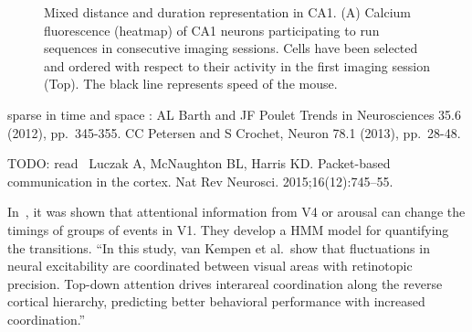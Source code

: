 \documentclass[brainsci, %
               review,submit,pdftex,moreauthors%
               ]{Definitions/mdpi}
\begin{document}
\begin{figure}
\centering
\caption{Mixed distance and duration representation in CA1. (A) Calcium fluorescence (heatmap) of CA1 neurons participating to run sequences in consecutive imaging sessions. Cells have been selected and ordered with respect to their activity in the first imaging session (Top). The black line represents speed of the mouse.}\label{fig:haimerl}
\end{figure}


sparse in time and space : AL Barth and JF Poulet Trends in Neurosciences 35.6 (2012), pp.~345-355. 
CC Petersen and S Crochet, Neuron 78.1 (2013), pp.~28-48.

TODO: read~\citep{luczak_packet-based_2015} Luczak A, McNaughton BL, Harris KD. Packet-based communication in the cortex. Nat Rev Neurosci. 2015;16(12):745--55.

In~\citep{van_kempen_top-down_2021}, it was shown that attentional information from V4 or arousal can change the timings of groups of events in V1. They develop a HMM model for quantifying the transitions. ``In this study, van Kempen et al.~show that fluctuations in neural excitability are coordinated between visual areas with retinotopic precision. Top-down attention drives interareal coordination along the reverse cortical hierarchy, predicting better behavioral performance with increased coordination.''
\end{document}
